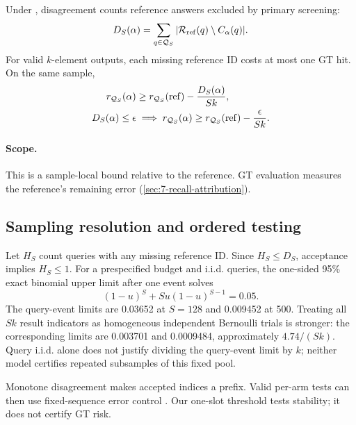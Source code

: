Under , disagreement counts reference answers
excluded by primary screening:
\begin{equation}
 D_S(\alpha)=\sum_{q\in\mathcal Q_S}
       |\mathcal R_{\rm ref}(q)\setminus C_\alpha(q)|.
 \label{eq:6-reference-coverage}
\end{equation}
For valid $k$-element outputs, each missing reference ID costs at most
one GT hit. On the same sample,
\begin{equation}
 \begin{aligned}
 r_{\mathcal Q_S}(\alpha)
 &\geq r_{\mathcal Q_S}({\rm ref})-\frac{D_S(\alpha)}{Sk},\\
 D_S(\alpha)\leq\epsilon
 &\implies r_{\mathcal Q_S}(\alpha)
       \geq r_{\mathcal Q_S}({\rm ref})-\frac{\epsilon}{Sk}.
 \end{aligned}
 \label{eq:6-relative-recall}
\end{equation}
\paragraph{Scope.}
This is a sample-local bound relative to the reference. GT evaluation
measures the reference's remaining error (\cref{sec:7-recall-attribution}).

\subsection{Sampling resolution and ordered testing}

Let $H_S$ count queries with any missing reference ID. Since $H_S\leq D_S$,
acceptance implies $H_S\leq1$. For a prespecified budget and i.i.d.
queries, the one-sided 95\% exact binomial upper limit after one event solves
\cite{nist_binomial}
\begin{equation}
 (1-u)^S+Su(1-u)^{S-1}=0.05.
 \label{eq:6-binomial-limit}
\end{equation}
The query-event limits are 0.03652 at $S=128$ and 0.009452 at 500.
Treating all $Sk$ result indicators as homogeneous independent Bernoulli
trials is stronger: the corresponding limits are 0.003701 and 0.0009484,
approximately $4.74/(Sk)$. Query i.i.d. alone does not justify dividing
the query-event limit by $k$; neither model certifies repeated subsamples
of this fixed pool.

Monotone disagreement makes accepted indices a prefix. Valid per-arm tests can then use fixed-sequence error control \cite{learn_then_test}. Our one-slot threshold tests stability; it does not certify GT risk.

